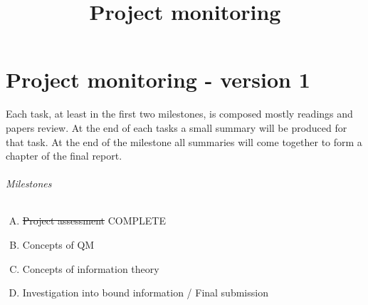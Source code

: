 \documentclass{article}
\title{Project monitoring}
\begin{document}
\part*{Project monitoring - version 1}
Each task, at least in the first two milestones, is composed mostly readings and papers review.
At the end of each tasks a small summary will be produced for that task. 
At the end of the milestone all summaries will come together to form a chapter of the final report. \\

\paragraph*{Milestones}
\begin{enumerate}[A)]
\item \sout{Project assessment} COMPLETE 
\item Concepts of QM
\item Concepts of information theory
\item Investigation into bound information / Final submission
\end{enumerate}
\end{document}
